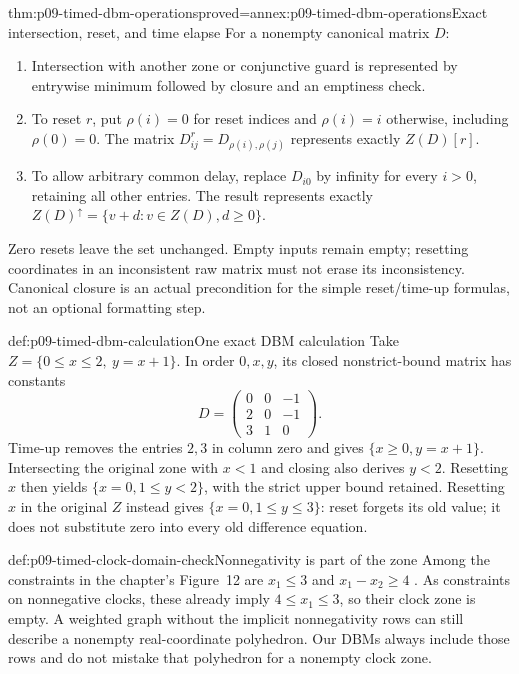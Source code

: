 \begin{hbtheorem}{thm:p09-timed-dbm-operations}{proved=annex:p09-timed-dbm-operations}{Exact intersection, reset, and time elapse}
For a nonempty canonical matrix \(D\):
\begin{enumerate}
\item Intersection with another zone or conjunctive guard is represented
      by entrywise minimum followed by closure and an emptiness check.
\item To reset \(r\), put \(\rho(i)=0\) for reset indices and
      \(\rho(i)=i\) otherwise, including \(\rho(0)=0\). The matrix
      \(D^r_{ij}=D_{\rho(i),\rho(j)}\) represents exactly \(Z(D)[r]\).
\item To allow arbitrary common delay, replace \(D_{i0}\) by infinity
      for every \(i>0\), retaining all other entries. The result represents
      exactly \(Z(D)^\uparrow=\{v+d:v\in Z(D),d\geq0\}\).
\end{enumerate}
Zero resets leave the set unchanged. Empty inputs remain empty; resetting
coordinates in an inconsistent raw matrix must not erase its inconsistency.
Canonical closure is an actual precondition for the simple reset/time-up
formulas, not an optional formatting step.
\end{hbtheorem}

\begin{hbexample}{def:p09-timed-dbm-calculation}{One exact DBM calculation}
Take \(Z=\{0\leq x\leq2,\ y=x+1\}\). In order \(0,x,y\), its closed
nonstrict-bound matrix has constants
\[
 D=\begin{pmatrix}0&0&-1\\2&0&-1\\3&1&0\end{pmatrix}.
\]
Time-up removes the entries \(2,3\) in column zero and gives
\(\{x\geq0,y=x+1\}\). Intersecting the original zone with \(x<1\)
and closing also derives \(y<2\). Resetting \(x\) then yields
\(\{x=0,1\leq y<2\}\), with the strict upper bound retained.
Resetting \(x\) in the original \(Z\) instead gives
\(\{x=0,1\leq y\leq3\}\): reset forgets its old value; it does not
substitute zero into every old difference equation.
\end{hbexample}

\begin{hbexample}{def:p09-timed-clock-domain-check}{Nonnegativity is part of the zone}
Among the constraints in the chapter's Figure~12 are \(x_1\leq3\) and
\(x_1-x_2\geq4\) \cite[p.~1025]{BouyerEtAl2018TimedChapter}.
As constraints on nonnegative clocks, these already imply
\(4\leq x_1\leq3\), so their clock zone is empty. A weighted graph
without the implicit nonnegativity rows can still describe a nonempty
real-coordinate polyhedron. Our DBMs always include those rows and do
not mistake that polyhedron for a nonempty clock zone.
\end{hbexample}

